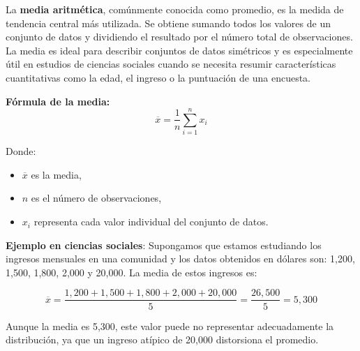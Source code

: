 \documentclass[
  letterpaper,
  DIV=11,
  numbers=noendperiod]{scrreprt}
\providecommand{\tightlist}{%
  \setlength{\itemsep}{0pt}\setlength{\parskip}{0pt}}\usepackage{longtable,booktabs,array}
\begin{document}
La \textbf{media aritmética}, comúnmente conocida como promedio, es la
medida de tendencia central más utilizada. Se obtiene sumando todos los
valores de un conjunto de datos y dividiendo el resultado por el número
total de observaciones. La media es ideal para describir conjuntos de
datos simétricos y es especialmente útil en estudios de ciencias
sociales cuando se necesita resumir características cuantitativas como
la edad, el ingreso o la puntuación de una encuesta.

\begin{tcolorbox}[enhanced jigsaw, toprule=.15mm, opacitybacktitle=0.6, toptitle=1mm, arc=.35mm, left=2mm, title=\textcolor{quarto-callout-warning-color}{\faExclamationTriangle}\hspace{0.5em}{Warning}, titlerule=0mm, leftrule=.75mm, rightrule=.15mm, coltitle=black, bottomtitle=1mm, bottomrule=.15mm, colframe=quarto-callout-warning-color-frame, opacityback=0, colback=white, breakable, colbacktitle=quarto-callout-warning-color!10!white]

\textbf{Fórmula de la media:}
\[\overline{x} = \frac{1}{n} \sum_{i=1}^{n} x_i\]

Donde:

\begin{itemize}
\tightlist
\item
  \(\overline{x}\) es la media,
\item
  \(n\) es el número de observaciones,
\item
  \(x_i\) representa cada valor individual del conjunto de datos.
\end{itemize}

\end{tcolorbox}

\begin{tcolorbox}[enhanced jigsaw, toprule=.15mm, opacitybacktitle=0.6, toptitle=1mm, arc=.35mm, left=2mm, title=\textcolor{quarto-callout-tip-color}{\faLightbulb}\hspace{0.5em}{Tip}, titlerule=0mm, leftrule=.75mm, rightrule=.15mm, coltitle=black, bottomtitle=1mm, bottomrule=.15mm, colframe=quarto-callout-tip-color-frame, opacityback=0, colback=white, breakable, colbacktitle=quarto-callout-tip-color!10!white]

\textbf{Ejemplo en ciencias sociales}: Supongamos que estamos estudiando
los ingresos mensuales en una comunidad y los datos obtenidos en dólares
son: 1,200, 1,500, 1,800, 2,000 y 20,000. La media de estos ingresos es:

\[\overline{x} = \frac{1,200 + 1,500 + 1,800 + 2,000 + 20,000}{5} = \frac{26,500}{5} = 5,300\]

Aunque la media es 5,300, este valor puede no representar adecuadamente
la distribución, ya que un ingreso atípico de 20,000 distorsiona el
promedio.

\end{tcolorbox}
\end{document}
